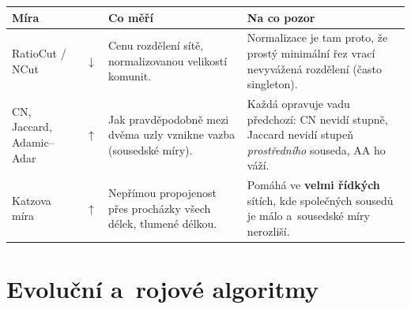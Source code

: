 \documentclass[11pt,a4paper]{article}
\makeatletter
\newcommand{\up}{\textcolor{upcol}{$\boldsymbol{\uparrow}$}}
\newcommand{\down}{\textcolor{downcol}{$\boldsymbol{\downarrow}$}}
\newenvironment{mirytab}{%
  \par\medskip\noindent\small
  \begin{tabular}{@{}>{\raggedright\arraybackslash}p{3.15cm}
                    >{\centering\arraybackslash}p{0.85cm}
                    >{\raggedright\arraybackslash}p{5.3cm}
                    >{\raggedright\arraybackslash}p{6.1cm}@{}}
  \toprule
  \textbf{Míra} & & \textbf{Co měří} & \textbf{Na co pozor} \\
  \midrule}%
  {\bottomrule\end{tabular}\par\medskip}
\makeatother
\begin{document}
\begin{mirytab}
RatioCut / NCut & \down &
Cenu rozdělení sítě, normalizovanou velikostí komunit. &
Normalizace je tam proto, že prostý minimální řez vrací nevyvážená rozdělení
(často singleton). \\[2pt]

CN, Jaccard, Adamic--Adar & \up &
Jak pravděpodobně mezi dvěma uzly vznikne vazba (sousedské míry). &
Každá opravuje vadu předchozí: CN nevidí stupně, Jaccard nevidí stupeň
\emph{prostředního} souseda, AA ho váží. \\[2pt]

Katzova míra & \up &
Nepřímou propojenost přes procházky všech délek, tlumené délkou. &
Pomáhá ve \textbf{velmi řídkých} sítích, kde společných sousedů je málo a~sousedské
míry nerozliší. \\
\end{mirytab}

\section{Evoluční a~rojové algoritmy}
\end{document}

